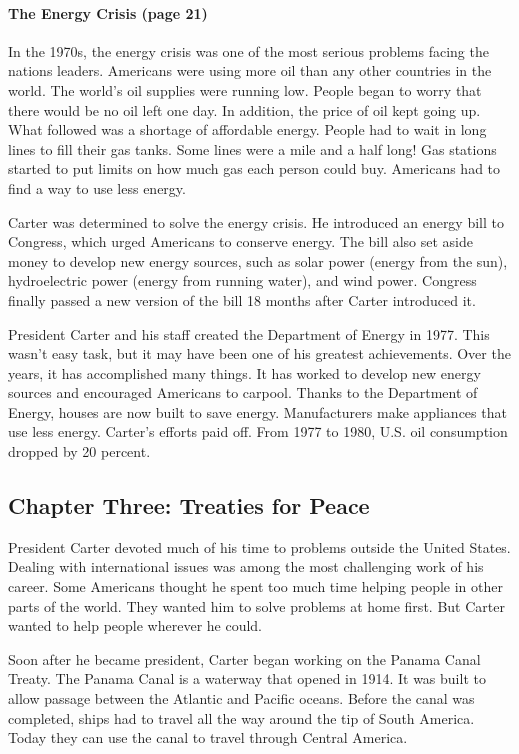 \documentclass{article}
\begin{document}
\paragraph{The Energy Crisis (page 21)}
In the 1970s, the energy crisis was one of the most serious problems facing the nations leaders. Americans were using more oil than any other countries in the world. The world's oil supplies were running low. People began to worry that there would be no oil left one day. In addition, the price of oil kept going up. What followed was a shortage of affordable energy. People had to wait in long lines to fill their gas tanks. Some lines were a mile and a half long! Gas stations started to put limits on how much gas each person could buy. Americans had to find a way to use less energy.

Carter was determined to solve the energy crisis. He introduced an energy bill to Congress, which urged Americans to conserve energy. The bill also set aside money to develop new energy sources, such as solar power (energy from the sun), hydroelectric power (energy from running water), and wind power. Congress finally passed a new version of the bill 18 months after Carter introduced it. 

President Carter and his staff created the Department of Energy in 1977. This wasn't easy task, but it may have been one of his greatest achievements. Over the years, it has accomplished many things. It has worked to develop new energy sources and encouraged Americans to carpool. Thanks to the Department of Energy, houses are now built to save energy. Manufacturers make appliances that use less energy. Carter's efforts paid off. From 1977 to 1980, U.S. oil consumption dropped by 20 percent.


\subsection*{Chapter Three: Treaties for Peace}

President Carter devoted much of his time to problems outside the United States. Dealing with international issues was among the most challenging work of his career. Some Americans thought he spent too much time helping people in other parts of the world. They wanted him to solve problems at home first. But Carter wanted to help people wherever he could.

Soon after he became president, Carter began working on the Panama Canal Treaty. The Panama Canal is a waterway that opened in 1914. It was built to allow passage between the Atlantic and Pacific oceans. Before the canal was completed, ships had to travel all the way around the tip of South America. Today they can use the canal to travel through Central America.
\end{document}
